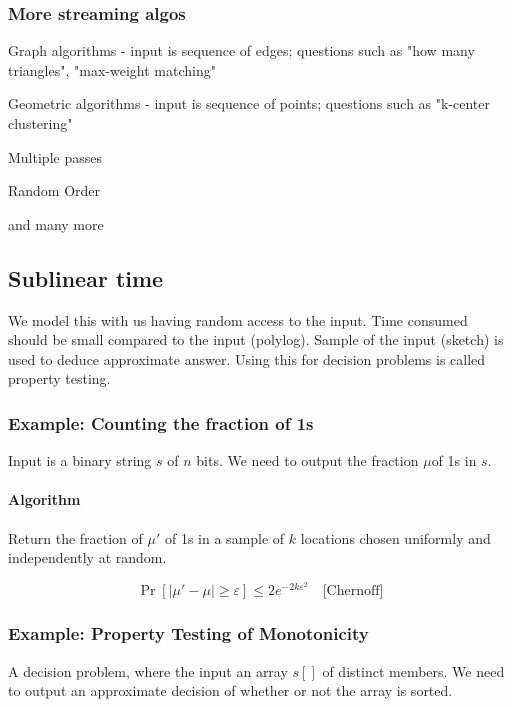\documentclass[a4paper]{article}
\newenvironment{itemize*}%
  {\begin{itemize}%
    \setlength{\itemsep}{0pt}%
    \setlength{\parsep}{0pt}%
    \setlength{\parskip}{0pt}}%
  {\end{itemize}}
\begin{document}
\subsubsection{More streaming algos}

\begin{itemize*}
  \item Graph algorithms - input is sequence of edges; questions such as "how many triangles", "max-weight matching"
  \item Geometric algorithms - input is sequence of points; questions such as "k-center clustering"
  \item Multiple passes
  \item Random Order
  \item and many more
\end{itemize*}

\subsection{Sublinear time}
We model this with us having random access to the input.
Time consumed should be small compared to the input (polylog).
Sample of the input (sketch) is used to deduce approximate answer.
Using this for decision problems is called property testing.

\subsubsection{Example: Counting the fraction of 1s}
Input is a binary string $s$ of $n$ bits.
We need to output the fraction $\mu$of 1s in $s$.

\paragraph{Algorithm}
Return the fraction of $\mu'$ of 1s in a sample of $k$ locations chosen uniformly and independently at random.

\[\Pr[|\mu'-\mu| \ge \varepsilon] \le 2e^{-2k\varepsilon^2}\quad\text{[Chernoff]}\]

\subsubsection{Example: Property Testing of Monotonicity}
A decision problem, where the input an array $s[]$ of distinct members.
We need to output an approximate decision of whether or not the array is sorted.

\end{document}
